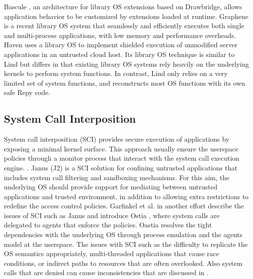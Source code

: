 Bascule \cite{Bascule}, an architecture for library OS extensions
based on Drawbridge, allows application behavior to be customized by
extensions loaded at runtime.
Graphene \cite{Graphene-14} is a recent library OS system that
seamlessly and efficiently executes both single and
multi-process applications, with low memory and performance overheads.
Haven \cite{Haven} uses a library OS to implement
shielded execution of unmodified server applications
in an untrusted cloud host. 
Its library OS technique is similar to Lind but differs in 
that existing library OS systems rely heavily on
the underlying kernels to perform system functions. In contrast, Lind only
relies on a very limited set of system functions,
and reconstructs most OS functions with its own safe Repy code. 

\subsection{System Call Interposition}

System call interposition (SCI) provides 
secure execution of applications by exposing a minimal kernel surface. This approach usually ensure the userspace policies through a monitor process that interact with the system call execution engine.   
\cite{SCI-04}.  
Janus (J2) \cite{Janus0:96, Janus:99} is a SCI solution for confining untrusted applications that includes system call filtering and sandboxing mechanisms. For this aim, the underlying OS should provide support for mediating between untrusted applications and trusted environment, in addition to allowing extra restrictions to redefine the access control policies. Garfinkel et al. in another effort describe the issues of SCI such as Janus and introduce Ostia \cite{SCI-04}, where system calls are delegated to agents that enforce the policies. Oastia resolves the tight dependencies with the underlying OS through process emulation and the agents model at the userspace. The issues with SCI such as the difficulty to replicate the OS semantics appropriately, multi-threaded applications that cause race conditions, or indirect paths to resources that are often overlooked. Also system calls that are denied can cause inconsistencies that are discussed in \cite{Problems-SCI}.

